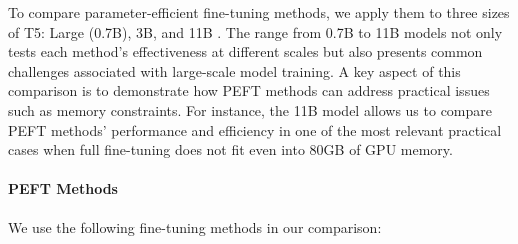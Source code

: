 To compare parameter-efficient fine-tuning methods, we apply them to three sizes of T5: Large (0.7B), 3B, and 11B \citep{t5}. The range from 0.7B to 11B models not only tests each method's effectiveness at different scales but also presents common challenges associated with large-scale model training. A key aspect of this comparison is to demonstrate how PEFT methods can address practical issues such as memory constraints. For instance, the 11B model allows us to compare PEFT methods' performance and efficiency in one of the most relevant practical cases when full fine-tuning does not fit even into 80GB of GPU memory.

\paragraph{PEFT Methods}

We use the following fine-tuning methods in our comparison:

